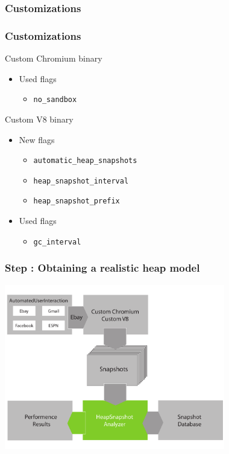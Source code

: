 \subsubsection{Customizations}
\begin{frame}
	\frametitle{Customizations}
			Custom Chromium binary
			\begin{itemize}
				\item Used flags
				\begin{itemize}
					\item \texttt{no\_sandbox} 						%
				\end{itemize}
			\end{itemize}
			
			Custom V8 binary
			\begin{itemize}
				\item New flags
				\begin{itemize}
					\item \texttt{automatic\_heap\_snapshots} 		%
					\item \texttt{heap\_snapshot\_interval} 		%
					\item \texttt{heap\_snapshot\_prefix} 			%
				\end{itemize}
				\item Used flags
				\begin{itemize}
					\item \texttt{gc\_interval} 					%
				\end{itemize}
			\end{itemize}
\end{frame}
	
\begin{frame}
	\frametitle{Step \theStepCounter: Obtaining a realistic heap model}		
	\includegraphics[width=26em]{../imgs/solution_h_3.pdf}
\end{frame}
	
